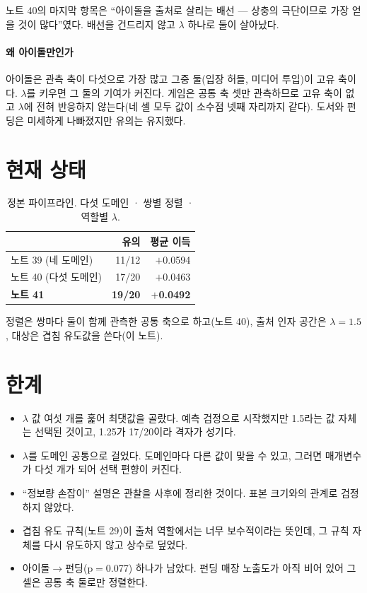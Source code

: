 \documentclass[10pt]{article}
\begin{document}
노트 40의 마지막 항목은 ``아이돌을 출처로 살리는 배선 --- 상충의 극단이므로
가장 얻을 것이 많다''였다. 배선을 건드리지 않고 $\lambda$ 하나로 둘이 살아났다.

\paragraph{왜 아이돌만인가}
아이돌은 관측 축이 다섯으로 가장 많고 그중 둘(입장 허들, 미디어 투입)이 고유
축이다. $\lambda$를 키우면 그 둘의 기여가 커진다. 게임은 공통 축 셋만 관측하므로
고유 축이 없고 $\lambda$에 전혀 반응하지 않는다(네 셀 모두 값이 소수점 넷째 자리까지
같다). 도서와 펀딩은 미세하게 나빠졌지만 유의는 유지했다.

\section{현재 상태}

\begin{table}[t]
\centering\tsize
\caption{정본 파이프라인. 다섯 도메인 · 쌍별 정렬 · 역할별 $\lambda$.}
\begin{tabular}{lrr}
\toprule
& 유의 & 평균 이득 \\
\midrule
노트 39 (네 도메인) & 11/12 & $+$0.0594 \\
노트 40 (다섯 도메인) & 17/20 & $+$0.0463 \\
\textbf{노트 41} & \textbf{19/20} & \textbf{$+$0.0492} \\
\bottomrule
\end{tabular}
\end{table}

정렬은 쌍마다 둘이 함께 관측한 공통 축으로 하고(노트 40), 출처 인자 공간은
$\lambda=1.5$, 대상은 겹침 유도값을 쓴다(이 노트).

\section{한계}

\begin{itemize}[leftmargin=1.1em,itemsep=0.15em]
\item $\lambda$ 값 여섯 개를 훑어 최댓값을 골랐다. 예측 검정으로 시작했지만
      1.5라는 값 자체는 선택된 것이고, 1.25가 17/20이라 격자가 성기다.
\item $\lambda$를 도메인 공통으로 걸었다. 도메인마다 다른 값이 맞을 수 있고,
      그러면 매개변수가 다섯 개가 되어 선택 편향이 커진다.
\item ``정보량 손잡이'' 설명은 관찰을 사후에 정리한 것이다. 표본 크기와의
      관계로 검정하지 않았다.
\item 겹침 유도 규칙(노트 29)이 출처 역할에서는 너무 보수적이라는 뜻인데,
      그 규칙 자체를 다시 유도하지 않고 상수로 덮었다.
\item 아이돌$\to$펀딩(p$=$0.077) 하나가 남았다. 펀딩 매장 노출도가 아직 비어
      있어 그 셀은 공통 축 둘로만 정렬한다.
\end{itemize}
\end{document}
